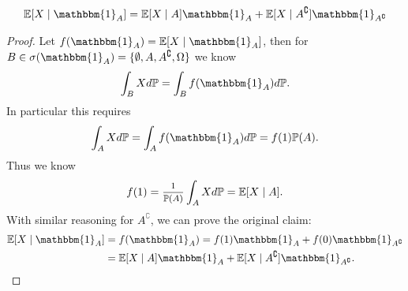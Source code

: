\begin{lemma}\label{appx:6}
    \begin{align*}
        \E[X\mid \mathbbm{1}_A]=\E[X\mid A]\mathbbm{1}_A +\E[X\mid A^\complement]\mathbbm{1}_{A^\complement}
    \end{align*}
\end{lemma}
\begin{proof}
    Let \(f(\mathbbm{1}_A)=\E[X\mid \mathbbm{1}_A]\), then for \(B\in\sigma(\mathbbm{1}_A)=\{\emptyset,A,A^\complement,\Omega\}\) we know
    \[
        \int_B X d\Pr =\int_B f(\mathbbm{1}_A)d\Pr.
    \]
    In particular this requires
    \begin{align}\label{constant expectation}
        \int_A X d\Pr = \int_A f(\mathbbm{1}_A)d\Pr = f(1) \Pr(A).
    \end{align}
    Thus we know
    \[
        f(1)=\mfrac{1}{\Pr(A)}\int_A X d\Pr=\E[X\mid A].
    \]
    With similar reasoning for \(A^\complement\), we can prove the original claim:
    \begin{align*}
        \E[X\mid \mathbbm{1}_A]
        &=f(\mathbbm{1}_A)=f(1)\mathbbm{1}_A + f(0)\mathbbm{1}_{A^\complement}\\
        &=\E[X\mid A]\mathbbm{1}_A +\E[X\mid A^\complement]\mathbbm{1}_{A^\complement}. \qedhere
    \end{align*}
\end{proof}

